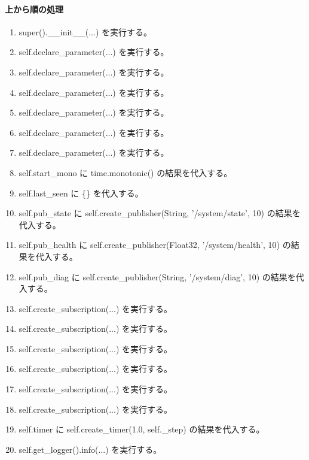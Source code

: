 \documentclass[a4paper,11pt]{article}
\begin{document}
            \paragraph{上から順の処理}
            \begin{enumerate}[leftmargin=1.8em]
            \item super().\_\_init\_\_(...) を実行する。
\item self.declare\_parameter(...) を実行する。
\item self.declare\_parameter(...) を実行する。
\item self.declare\_parameter(...) を実行する。
\item self.declare\_parameter(...) を実行する。
\item self.declare\_parameter(...) を実行する。
\item self.declare\_parameter(...) を実行する。
\item self.start\_mono に time.monotonic() の結果を代入する。
\item self.last\_seen に \{\} を代入する。
\item self.pub\_state に self.create\_publisher(String, '/system/state', 10) の結果を代入する。
\item self.pub\_health に self.create\_publisher(Float32, '/system/health', 10) の結果を代入する。
\item self.pub\_diag に self.create\_publisher(String, '/system/diag', 10) の結果を代入する。
\item self.create\_subscription(...) を実行する。
\item self.create\_subscription(...) を実行する。
\item self.create\_subscription(...) を実行する。
\item self.create\_subscription(...) を実行する。
\item self.create\_subscription(...) を実行する。
\item self.create\_subscription(...) を実行する。
\item self.timer に self.create\_timer(1.0, self.\_step) の結果を代入する。
\item self.get\_logger().info(...) を実行する。
            \end{enumerate}
\end{document}
